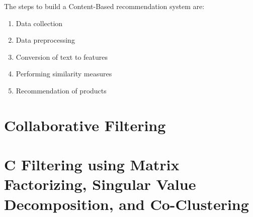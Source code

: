 \documentclass{article}
\begin{document}
\medskip

\noindent The steps to build a Content-Based recommendation system are:

\begin{enumerate}
    \item{Data collection}
    \item{Data preprocessing}
    \item{Conversion of text to features}
    \item{Performing similarity measures}
    \item{Recommendation of products}
\end{enumerate}

\section{Collaborative Filtering}
\section{C Filtering using Matrix Factorizing, Singular Value Decomposition, and Co-Clustering}
\end{document}
